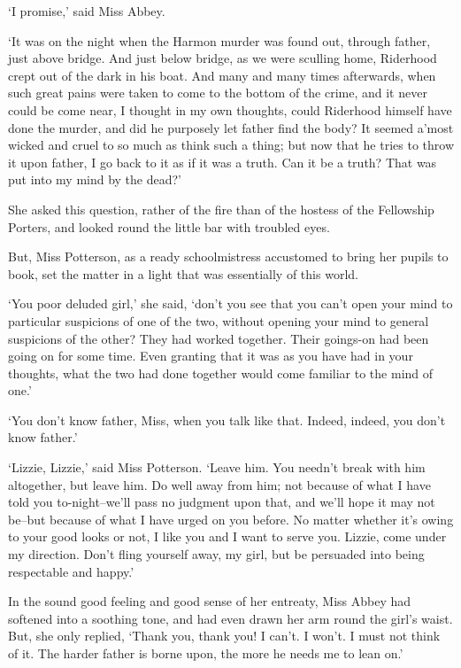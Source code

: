 ‘I promise,’ said Miss Abbey.

‘It was on the night when the Harmon murder was found out, through
father, just above bridge. And just below bridge, as we were sculling
home, Riderhood crept out of the dark in his boat. And many and many
times afterwards, when such great pains were taken to come to the bottom
of the crime, and it never could be come near, I thought in my own
thoughts, could Riderhood himself have done the murder, and did he
purposely let father find the body? It seemed a’most wicked and cruel
to so much as think such a thing; but now that he tries to throw it upon
father, I go back to it as if it was a truth. Can it be a truth? That
was put into my mind by the dead?’

She asked this question, rather of the fire than of the hostess of the
Fellowship Porters, and looked round the little bar with troubled eyes.

But, Miss Potterson, as a ready schoolmistress accustomed to bring her
pupils to book, set the matter in a light that was essentially of this
world.

‘You poor deluded girl,’ she said, ‘don’t you see that you can’t open
your mind to particular suspicions of one of the two, without opening
your mind to general suspicions of the other? They had worked together.
Their goings-on had been going on for some time. Even granting that it
was as you have had in your thoughts, what the two had done together
would come familiar to the mind of one.’

‘You don’t know father, Miss, when you talk like that. Indeed, indeed,
you don’t know father.’

‘Lizzie, Lizzie,’ said Miss Potterson. ‘Leave him. You needn’t break
with him altogether, but leave him. Do well away from him; not because
of what I have told you to-night--we’ll pass no judgment upon that,
and we’ll hope it may not be--but because of what I have urged on you
before. No matter whether it’s owing to your good looks or not, I like
you and I want to serve you. Lizzie, come under my direction. Don’t
fling yourself away, my girl, but be persuaded into being respectable
and happy.’

In the sound good feeling and good sense of her entreaty, Miss Abbey
had softened into a soothing tone, and had even drawn her arm round the
girl’s waist. But, she only replied, ‘Thank you, thank you! I can’t. I
won’t. I must not think of it. The harder father is borne upon, the more
he needs me to lean on.’

